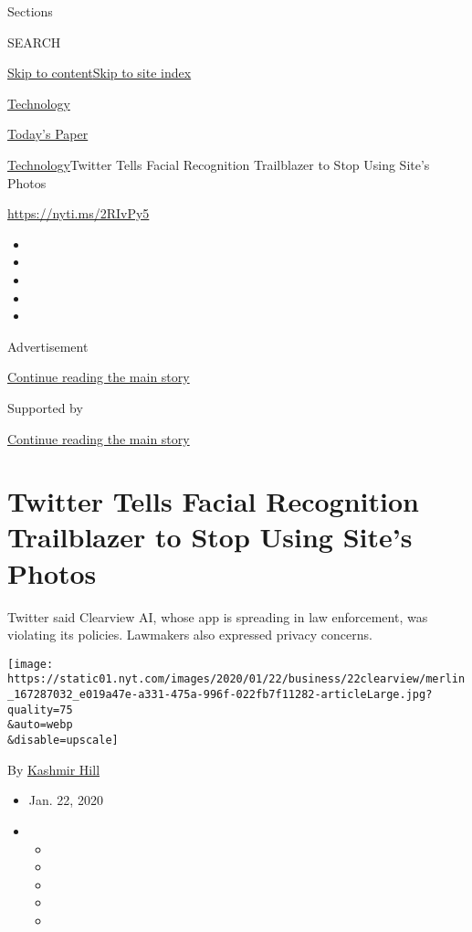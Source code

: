 Sections

SEARCH

\protect\hyperlink{site-content}{Skip to
content}\protect\hyperlink{site-index}{Skip to site index}

\href{https://www.nytimes.com/section/technology}{Technology}

\href{https://myaccount.nytimes.com/auth/login?response_type=cookie\&client_id=vi}{}

\href{https://www.nytimes.com/section/todayspaper}{Today's Paper}

\href{/section/technology}{Technology}\textbar{}Twitter Tells Facial
Recognition Trailblazer to Stop Using Site's Photos

\url{https://nyti.ms/2RIvPy5}

\begin{itemize}
\item
\item
\item
\item
\item
\end{itemize}

Advertisement

\protect\hyperlink{after-top}{Continue reading the main story}

Supported by

\protect\hyperlink{after-sponsor}{Continue reading the main story}

\hypertarget{twitter-tells-facial-recognition-trailblazer-to-stop-using-sites-photos}{%
\section{Twitter Tells Facial Recognition Trailblazer to Stop Using
Site's
Photos}\label{twitter-tells-facial-recognition-trailblazer-to-stop-using-sites-photos}}

Twitter said Clearview AI, whose app is spreading in law enforcement,
was violating its policies. Lawmakers also expressed privacy concerns.

\texttt{[image: https://static01.nyt.com/images/2020/01/22/business/22clearview/merlin\_167287032\_e019a47e-a331-475a-996f-022fb7f11282-articleLarge.jpg?quality=75\\\&auto=webp\\\&disable=upscale]}

By \href{https://www.nytimes.com/by/kashmir-hill}{Kashmir Hill}

\begin{itemize}
\item
  Jan. 22, 2020
\item
  \begin{itemize}
  \item
  \item
  \item
  \item
  \item
  \end{itemize}
\end{itemize}

